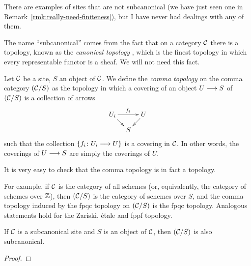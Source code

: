 \begin{2   CONTRAVARIANT FUNCTORS}
\begin{2.3 Sheaves in Grothendieck topologies}
There are examples of sites that are not subcanonical (we have just seen one in Remark~\ref{rmk:really-need-finiteness}), but I have never had dealings with any of them.

The name ``subcanonical'' comes from the fact that on a category $\mathcal{C}$ there is a topology, known as the \emph{canonical topology}%
%
, which is the finest topology in which every representable functor is a sheaf. We will not need this fact.


\begin{definition}\label{def:comma-topology}
Let $\mathcal{C}$ be a site, $S$ an object of $\mathcal{C}$. We define the \emph{comma topology}%
%
 on the comma category $(\mathcal{C}/S)$ as the topology in which a covering of  an object $U \arr S$ of $(\mathcal{C}/S)$ is a collection of arrows
   \[
   \xymatrix@-15pt{
   U_i\ar[rr]^{f_i}\ar[rd] && U\ar[ld]\\
   &S
   }
   \]
such that the collection $\{f_i \colon U_i \arr U\}$ is a covering in $\mathcal{C}$. In other words, the coverings of $U \arr S$ are simply the coverings of $U$.
\end{definition}

It is very easy to check that the comma topology is in fact a topology.

For example, if $\mathcal{C}$ is the category of all schemes (or, equivalently, the category of schemes over $\mathbb{Z}$), then $(\mathcal{C}/S)$ is the category of schemes over $S$, and the comma topology induced by the fpqc topology on $(\mathcal{C}/S)$ is the fpqc topology. Analogous statements hold for the Zariski, \'etale and fppf topology.


\begin{proposition}\label{prop:comma-subcanonical}
If $\mathcal{C}$ is a subcanonical site and $S$ is an object of $\mathcal{C}$, then $(\mathcal{C}/S)$ is also subcanonical.
\end{proposition}

\begin{proof}


\end{proof}
\end{2.3 Sheaves in Grothendieck topologies}
\end{2   CONTRAVARIANT FUNCTORS}

